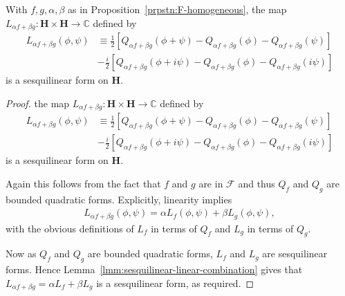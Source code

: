\begin{proposition}
    \label{prpstn:F-sesquilinear}
    \leanok
    With $f,g,\alpha,\beta$ as in Proposition~\ref{prpstn:F-homogeneous}, the map $L_{\alpha f + \beta g} : \mathbf{H} \times \mathbf{H} \rightarrow \mathbb{C}$ defined by
    \begin{align}
        L_{\alpha f + \beta g}(\phi, \psi) &\equiv \frac{1}{2} \left[ Q_{\alpha f + \beta g}(\phi + \psi) - Q_{\alpha f + \beta g}(\phi) - Q_{\alpha f + \beta g}(\psi) \right] \\
                                           &-\frac{i}{2} \left[ Q_{\alpha f + \beta g}(\phi + i\psi) - Q_{\alpha f + \beta g}(\phi) - Q_{\alpha f + \beta g}(i\psi) \right]
    \end{align}
    is a sesquilinear form on $\mathbf{H}$.
\end{proposition}
\begin{proof}
    \leanok
the map $L_{\alpha f + \beta g} : \mathbf{H} \times \mathbf{H} \rightarrow \mathbb{C}$ defined by
\begin{align}
    L_{\alpha f + \beta g}(\phi, \psi) &\equiv \frac{1}{2} \left[ Q_{\alpha f + \beta g}(\phi + \psi) - Q_{\alpha f + \beta g}(\phi) - Q_{\alpha f + \beta g}(\psi) \right] \\
                                       &-\frac{i}{2} \left[ Q_{\alpha f + \beta g}(\phi + i\psi) - Q_{\alpha f + \beta g}(\phi) - Q_{\alpha f + \beta g}(i\psi) \right]
\end{align}
is a sesquilinear form on $\mathbf{H}$.

Again this follows from the fact that $f$ and $g$ are in $\mathcal{F}$ and thus $Q_f$ and $Q_g$ are bounded quadratic forms. Explicitly, linearity implies
\begin{align}
    L_{\alpha f + \beta g}(\phi, \psi) = \alpha L_f(\phi, \psi) + \beta L_g(\phi, \psi),
\end{align}
with the obvious definitions of $L_f$ in terms of $Q_f$ and $L_g$ in terms of $Q_g$.

Now as $Q_f$ and $Q_g$ are bounded quadratic forms, $L_f$ and $L_g$ are sesquilinear forms. Hence Lemma~\ref{lmm:sesquilinear-linear-combination} gives that $L_{\alpha f + \beta g} = \alpha L_f + \beta L_g$ is a sesquilinear form, as required.
\end{proof}

